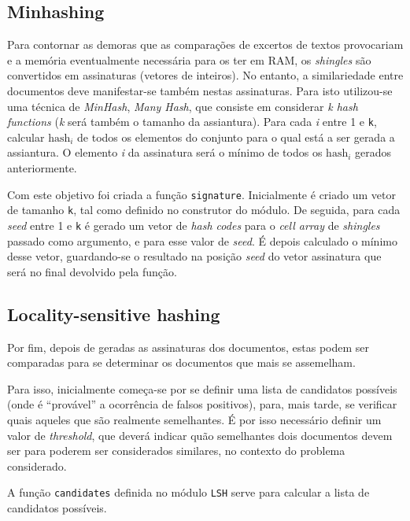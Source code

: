 \documentclass[a4paper,11pt,openright,oneside]{report}
\begin{document}
\subsection{Minhashing}
\label{subsec.minhash}

Para contornar as demoras que as comparações de excertos de textos provocariam e a memória eventualmente necessária para os ter em RAM, os \textit{shingles} são convertidos em assinaturas (vetores de inteiros). No entanto, a similariedade entre documentos deve manifestar-se também nestas assinaturas. Para isto utilizou-se uma técnica de \textit{MinHash}, \textit{Many Hash}, que consiste em considerar \textit{k hash functions} (\textit{k} será também o tamanho da assiantura). Para cada \textit{i} entre 1 e \texttt{k}, calcular $\text{hash}_i$ de todos os elementos do conjunto para o qual está a ser gerada a assiantura. O elemento \textit{i} da assinatura será o mínimo de todos os $\text{hash}_i$ gerados anteriormente.

Com este objetivo foi criada a função \texttt{signature}. Inicialmente é criado um vetor de tamanho \texttt{k}, tal como definido no construtor do módulo. De seguida, para cada \textit{seed} entre 1 e \texttt{k} é gerado um vetor de \textit{hash codes} para o \textit{cell array} de \textit{shingles} passado como argumento, e para esse valor de \textit{seed}. É depois calculado o mínimo desse vetor, guardando-se o resultado na posição \textit{seed} do vetor assinatura que será no final devolvido pela função.

\subsection{Locality-sensitive hashing}
\label{subsec.lsh}

Por fim, depois de geradas as assinaturas dos documentos, estas podem ser comparadas para se determinar os documentos que mais se assemelham.

Para isso, inicialmente começa-se por se definir uma lista de candidatos possíveis (onde é ``provável'' a ocorrência de falsos positivos), para, mais tarde, se verificar quais aqueles que são realmente semelhantes. É por isso necessário definir um valor de \textit{threshold}, que deverá indicar quão semelhantes dois documentos devem ser para poderem ser considerados similares, no contexto do problema considerado.

A função \texttt{candidates} definida no módulo \texttt{LSH} serve para calcular a lista de candidatos possíveis.
\end{document}

